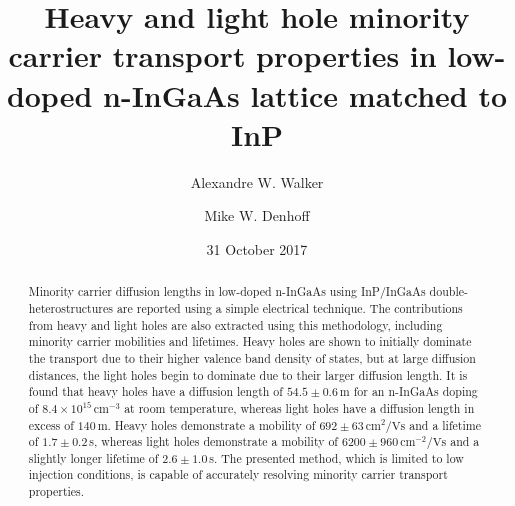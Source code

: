 \documentclass[aip,amsmath,amssymb,reprint]{revtex4-1}
\begin{document}
 



\title{Heavy and light hole minority carrier transport properties in low-doped n-InGaAs lattice matched to InP}

\author{Alexandre W. Walker}
\author{Mike W. Denhoff}

\date{31 October 2017}

 

\begin{abstract}
Minority carrier diffusion lengths in low-doped n-InGaAs using InP/InGaAs double-heterostructures are reported using a simple electrical technique.
 The contributions from heavy and light holes are also extracted using this methodology, including minority carrier mobilities and lifetimes.
 Heavy holes are shown to initially dominate the transport due to their higher valence band density of states, but at large diffusion distances, the light holes begin to dominate due to their larger diffusion length.
 It is found that heavy holes have a diffusion length of $54.5\pm0.6\, $\textmu m for an n-InGaAs doping of $8.4\times10^{15}\, \text{cm}^{-3}$ at room temperature, whereas light holes have a diffusion length in excess of $140\, $\textmu m.
 Heavy holes demonstrate a mobility of $692\pm63\,\text{cm}^{2}/\text{Vs}$ and a lifetime of $1.7\pm0.2\,$\textmu s, whereas light holes demonstrate a mobility of $6200\pm960\, \text{cm}^{-2}/\text{Vs}$ and a slightly longer lifetime of $2.6\pm1.0\,$\textmu s. The presented method, which is limited to low injection conditions, is capable of accurately resolving minority carrier transport properties.
\end{abstract}
\end{document}
